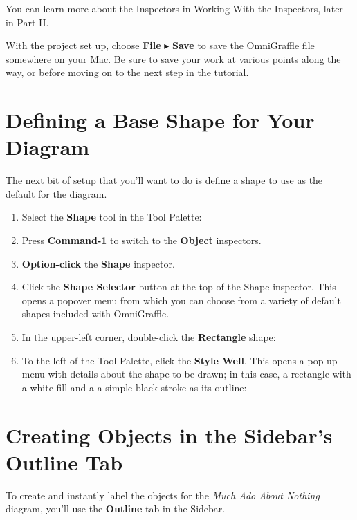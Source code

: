 \documentclass[../main.tex]{subfiles}
\begin{document}
\begin{ogtip}
  You can learn more about the Inspectors in Working With the Inspectors, later in Part II.
\end{ogtip}

With the project set up, choose \textbf{File} $\blacktriangleright$ \textbf{Save} to save the
OmniGraffle file somewhere on your Mac. Be sure to save your work at various points along the
way, or before moving on to the next step in the tutorial.

\section{Defining a Base Shape for Your Diagram}

The next bit of setup that you'll want to do is define a shape to use as the default for the
diagram.

\begin{enumerate}
  \item Select the \textbf{Shape} tool in the Tool Palette:

  \item Press \textbf{Command-1} to switch to the \textbf{Object} inspectors.
  \item \textbf{Option-click} the \textbf{Shape} inspector.
  \item Click the \textbf{Shape Selector} button at the top of the Shape inspector. This opens a
    popover menu from which you can choose from a variety of default shapes included with
    OmniGraffle.
  \item In the upper-left corner, double-click the \textbf{Rectangle} shape:

  \item To the left of the Tool Palette, click the \textbf{Style Well}. This opens a pop-up menu
    with details about the shape to be drawn; in this case, a rectangle with a white fill and a
    a simple black stroke as its outline:

\end{enumerate}

\section{Creating Objects in the Sidebar's Outline Tab}

To create and instantly label the objects for the \textit{Much Ado About Nothing} diagram,
you'll use the \textbf{Outline} tab in the Sidebar.
\end{document}

